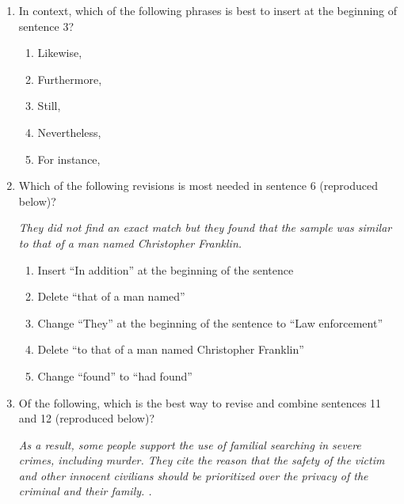 \bigskip
\begin{enumerate}

\item{In context, which of the following phrases is best to insert at the beginning of sentence 3?}
\begin{enumerate}[label=(\Alph*)]
\item{Likewise,}
\item{Furthermore,}
\item{Still,}
\item{Nevertheless,}
\item{For instance,}
\end{enumerate}

\bigskip
\item{Which of the following revisions is most needed in sentence 6 (reproduced below)?}

\textit{They did not find an exact match but they found that the sample was similar to that of a man named Christopher Franklin.}

\begin{enumerate}[label=(\Alph*)]
\item Insert ``In addition'' at the beginning of the sentence
\item Delete ``that of a man named''
\item Change ``They'' at the beginning of the sentence to ``Law enforcement''
\item Delete ``to that of a man named Christopher Franklin''
\item Change ``found'' to ``had found''
\end{enumerate}

\bigskip
\item{Of the following, which is the best way to revise and combine sentences 11 and 12 (reproduced below)?}

\textit{As a result, some people support the use of familial searching in severe crimes, including murder. They cite the reason that the safety of the victim and other innocent civilians should be prioritized over the privacy of the criminal and their family. .}


\end{enumerate}
